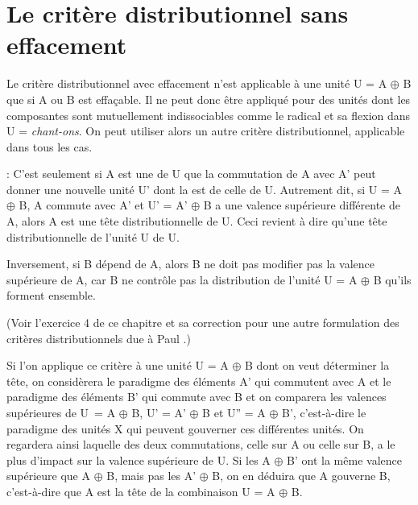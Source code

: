 \section{Le critère distributionnel sans effacement}\label{sec:3.3.13}

Le critère distributionnel avec effacement n’est applicable à une unité U = A ${\oplus}$ B que si A ou B est effaçable. Il ne peut donc être appliqué pour des unités dont les composantes sont mutuellement indissociables comme le radical et sa flexion dans U = \textit{chant-ons}. On peut utiliser alors un autre critère distributionnel, applicable dans tous les cas.

{ : C’est seulement si A est une  de U que la commutation de A avec A’ peut donner une nouvelle unité U’ dont la  est  de celle de U. Autrement dit, si U = A ${\oplus}$ B, A commute avec A’ et U’ = A’ ${\oplus}$ B a une valence supérieure différente de A, alors A est une tête distributionnelle de U. Ceci revient à dire qu'une tête distributionnelle de l'unité U  de U.

\indent Inversement, si B dépend de A, alors B ne doit pas modifier pas la valence supérieure de A, car B ne contrôle pas la distribution de l'unité U = A ${\oplus}$ B qu'ils forment ensemble.}

\noindent (Voir l’exercice 4 de ce chapitre et sa correction pour une autre formulation des critères distributionnels due à Paul \citealt{garde1977ordre}.) 

Si l’on applique ce critère à une unité U = A ${\oplus}$ B dont on veut déterminer la tête, on considèrera le paradigme des éléments A’ qui commutent avec A et le paradigme des éléments B’ qui commute avec B et on comparera les valences supérieures de U~= A ${\oplus}$ B, U’ = A’ ${\oplus}$ B et U” = A ${\oplus}$ B’, c’est-à-dire le paradigme des unités X qui peuvent gouverner ces différentes unités.
On regardera ainsi laquelle des deux commutations, celle sur A ou celle sur B, a le plus d’impact sur la valence supérieure de U. Si les A ${\oplus}$ B’ ont la même valence supérieure que A ${\oplus}$ B, mais pas les A’ ${\oplus}$ B, on en déduira que A gouverne B, c’est-à-dire que A est la tête de la combinaison U = A ${\oplus}$ B.

